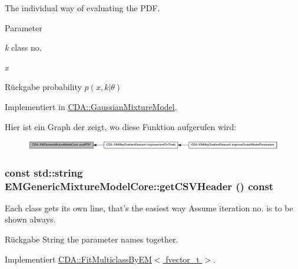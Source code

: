 The individual way of evaluating the PDF. 


\begin{DoxyParams}{Parameter}
\item[{\em k}]class no. \item[{\em x}]\end{DoxyParams}
\begin{DoxyReturn}{Rückgabe}
probability $p(x,k\vert\theta)$ 
\end{DoxyReturn}


Implementiert in \hyperlink{classCDA_1_1GaussianMixtureModel_ad89163c9bc3bdd8565a1fdcd9206d762}{CDA::GaussianMixtureModel}.



Hier ist ein Graph der zeigt, wo diese Funktion aufgerufen wird:\nopagebreak
\begin{figure}[H]
\begin{center}
\leavevmode
\includegraphics[width=420pt]{classCDA_1_1EMGenericMixtureModelCore_a3f291b20f5345b1e302bf46338d2f5f3_icgraph}
\end{center}
\end{figure}


\hypertarget{classCDA_1_1EMGenericMixtureModelCore_a10bd69fd4b420a274aee5f10e09ed5fe}{
\subsubsection[{getCSVHeader}]{\setlength{\rightskip}{0pt plus 5cm}const std::string EMGenericMixtureModelCore::getCSVHeader () const}}
\label{classCDA_1_1EMGenericMixtureModelCore_a10bd69fd4b420a274aee5f10e09ed5fe}


Each class gets its own line, that's the easiest way Assume iteration no. is to be shown always. 

\begin{DoxyReturn}{Rückgabe}
String the parameter names together. 
\end{DoxyReturn}


Implementiert \hyperlink{classCDA_1_1FitMulticlassByEM_a6d7bf7ba4d3421d5dfef7bffb91d85c7}{CDA::FitMulticlassByEM$<$ fvector\_\-t $>$}.



